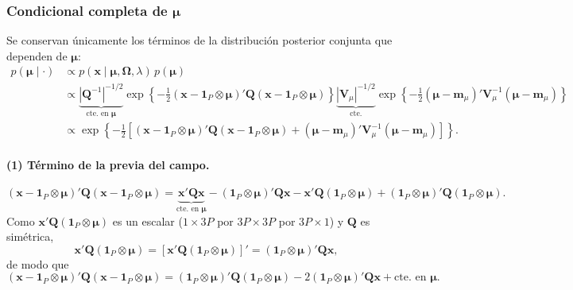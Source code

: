 \documentclass[11pt,a4paper]{article}
\begin{document}
\subsubsection*{Condicional completa de $\boldsymbol{\mu}$}

Se conservan únicamente los términos de la distribución posterior conjunta que dependen de $\boldsymbol{\mu}$:
\begin{align*}
p(\boldsymbol{\mu} \mid \cdot)
&\propto p(\boldsymbol{x} \mid \boldsymbol{\mu}, \mathbf{\Omega}, \lambda)\, p(\boldsymbol{\mu}) \\[6pt]
&\propto \underbrace{|\mathbf{Q}^{-1}|^{-1/2}}_{\text{cte. en }\boldsymbol{\mu}} \exp\left\{ -\frac{1}{2} (\boldsymbol{x} - \boldsymbol{1}_P \otimes \boldsymbol{\mu})' \mathbf{Q} (\boldsymbol{x} - \boldsymbol{1}_P \otimes \boldsymbol{\mu}) \right\}
\underbrace{|\mathbf{V}_\mu|^{-1/2}}_{\text{cte.}} \exp\left\{ -\frac{1}{2} (\boldsymbol{\mu} - \boldsymbol{m}_\mu)' \mathbf{V}_\mu^{-1} (\boldsymbol{\mu} - \boldsymbol{m}_\mu) \right\} \\[6pt]
&\propto \exp\left\{ -\frac{1}{2} \left[ (\boldsymbol{x} - \boldsymbol{1}_P \otimes \boldsymbol{\mu})' \mathbf{Q} (\boldsymbol{x} - \boldsymbol{1}_P \otimes \boldsymbol{\mu}) + (\boldsymbol{\mu} - \boldsymbol{m}_\mu)' \mathbf{V}_\mu^{-1} (\boldsymbol{\mu} - \boldsymbol{m}_\mu) \right] \right\}.
\end{align*}

\paragraph{(1) Término de la previa del campo.}
\[
(\boldsymbol{x} - \boldsymbol{1}_P \otimes \boldsymbol{\mu})' \mathbf{Q} (\boldsymbol{x} - \boldsymbol{1}_P \otimes \boldsymbol{\mu})
= \underbrace{\boldsymbol{x}'\mathbf{Q}\boldsymbol{x}}_{\text{cte. en }\boldsymbol{\mu}}
- (\boldsymbol{1}_P \otimes \boldsymbol{\mu})'\mathbf{Q}\boldsymbol{x}
- \boldsymbol{x}'\mathbf{Q}(\boldsymbol{1}_P \otimes \boldsymbol{\mu})
+ (\boldsymbol{1}_P \otimes \boldsymbol{\mu})'\mathbf{Q}(\boldsymbol{1}_P \otimes \boldsymbol{\mu}).
\]
Como $\boldsymbol{x}'\mathbf{Q}(\boldsymbol{1}_P \otimes \boldsymbol{\mu})$ es un escalar ($1\times 3P$ por $3P\times 3P$ por $3P\times 1$) y $\mathbf{Q}$ es simétrica,
\[
\boldsymbol{x}'\mathbf{Q}(\boldsymbol{1}_P \otimes \boldsymbol{\mu}) = \left[\boldsymbol{x}'\mathbf{Q}(\boldsymbol{1}_P \otimes \boldsymbol{\mu})\right]' = (\boldsymbol{1}_P \otimes \boldsymbol{\mu})'\mathbf{Q}\boldsymbol{x},
\]
de modo que
\[
(\boldsymbol{x} - \boldsymbol{1}_P \otimes \boldsymbol{\mu})' \mathbf{Q} (\boldsymbol{x} - \boldsymbol{1}_P \otimes \boldsymbol{\mu})
= (\boldsymbol{1}_P \otimes \boldsymbol{\mu})'\mathbf{Q}(\boldsymbol{1}_P \otimes \boldsymbol{\mu}) - 2(\boldsymbol{1}_P \otimes \boldsymbol{\mu})'\mathbf{Q}\boldsymbol{x} + \text{cte. en }\boldsymbol{\mu}.
\]
\end{document}
